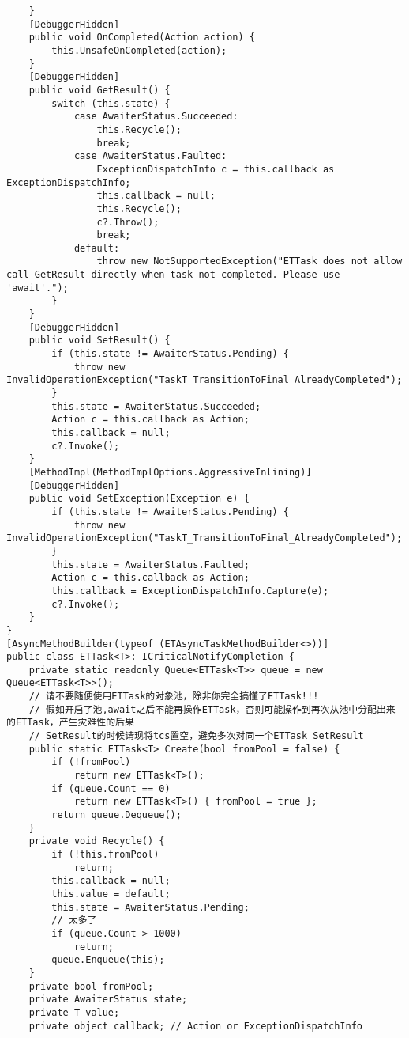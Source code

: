 \documentclass[9pt, b5paper]{article}
\begin{document}
\begin{itemize}
\begin{verbatim}
    }
    [DebuggerHidden]
    public void OnCompleted(Action action) {
        this.UnsafeOnCompleted(action);
    }
    [DebuggerHidden]
    public void GetResult() {
        switch (this.state) {
            case AwaiterStatus.Succeeded:
                this.Recycle();
                break;
            case AwaiterStatus.Faulted:
                ExceptionDispatchInfo c = this.callback as ExceptionDispatchInfo;
                this.callback = null;
                this.Recycle();
                c?.Throw();
                break;
            default:
                throw new NotSupportedException("ETTask does not allow call GetResult directly when task not completed. Please use 'await'.");
        }
    }
    [DebuggerHidden]
    public void SetResult() {
        if (this.state != AwaiterStatus.Pending) {
            throw new InvalidOperationException("TaskT_TransitionToFinal_AlreadyCompleted");
        }
        this.state = AwaiterStatus.Succeeded;
        Action c = this.callback as Action;
        this.callback = null;
        c?.Invoke();
    }
    [MethodImpl(MethodImplOptions.AggressiveInlining)]
    [DebuggerHidden]
    public void SetException(Exception e) {
        if (this.state != AwaiterStatus.Pending) {
            throw new InvalidOperationException("TaskT_TransitionToFinal_AlreadyCompleted");
        }
        this.state = AwaiterStatus.Faulted;
        Action c = this.callback as Action;
        this.callback = ExceptionDispatchInfo.Capture(e);
        c?.Invoke();
    }
}
[AsyncMethodBuilder(typeof (ETAsyncTaskMethodBuilder<>))]
public class ETTask<T>: ICriticalNotifyCompletion {
    private static readonly Queue<ETTask<T>> queue = new Queue<ETTask<T>>();
    // 请不要随便使用ETTask的对象池，除非你完全搞懂了ETTask!!!
    // 假如开启了池,await之后不能再操作ETTask，否则可能操作到再次从池中分配出来的ETTask，产生灾难性的后果
    // SetResult的时候请现将tcs置空，避免多次对同一个ETTask SetResult
    public static ETTask<T> Create(bool fromPool = false) {
        if (!fromPool) 
            return new ETTask<T>();
        if (queue.Count == 0) 
            return new ETTask<T>() { fromPool = true };    
        return queue.Dequeue();
    }
    private void Recycle() {
        if (!this.fromPool) 
            return;
        this.callback = null;
        this.value = default;
        this.state = AwaiterStatus.Pending;
        // 太多了
        if (queue.Count > 1000) 
            return;
        queue.Enqueue(this);
    }
    private bool fromPool;
    private AwaiterStatus state;
    private T value;
    private object callback; // Action or ExceptionDispatchInfo

\end{verbatim}
\end{itemize}
\end{document}
